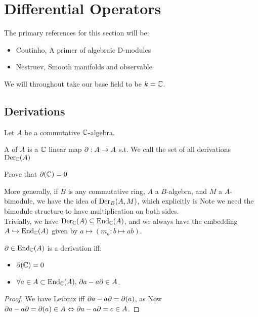\documentclass{article}
\begin{document}
\section{Differential Operators}

\begin{remark}
The primary references for this section will be:
\begin{itemize}
    \item Coutinho, A primer of algebraic D-modules
    \item Nestruev, Smooth manifolds and observable
\end{itemize}
We will throughout take our base field to be $k = \mathbb{C}$. 
\end{remark}

\subsection{Derivations}
Let $A$ be a commutative $\mathbb{C}$-algebra. 

\begin{definition}
A  of $A$ is a $\mathbb{C}$ linear map $\partial : A \to A$ s.t. 
We call the set of all derivations $\operatorname{Der}_{\mathbb{C}}(A)$
\end{definition}

\begin{ex}
Prove that $\partial(\mathbb{C}) = 0$
\end{ex}

More generally, if $B$ is any commutative ring, $A$ a $B$-algebra, and $M$ a $A$-bimodule, we have the idea of $\operatorname{Der}_B(A,M)$, which explicitly is 
Note we need the bimodule structure to have multiplication on both sides. \\
Trivially, we have $\operatorname{Der}_{\mathbb{C}}(A) \subseteq \operatorname{End}_{\mathbb{C}}(A)$, and we always have the embedding $ A \hookrightarrow \operatorname{End}_{\mathbb{C}}(A)$ given by $a \mapsto (m_a : b \mapsto ab)$. 

\begin{prop}
$\partial \in \operatorname{End}_{\mathbb{C}}(A)$ is a derivation iff:
\begin{itemize}
    \item $\partial(\mathbb{C}) = 0$
    \item $\forall a \in A\subset\operatorname{End}_{\mathbb{C}}(A), \, \partial a - a \partial \in A$. 
\end{itemize}
\end{prop}
\begin{proof}
We have Leibniz iff $\partial a - a\partial = \partial(a)$, as 
Now $\partial a - a \partial = \partial(a) \in A \Leftrightarrow \partial a - a \partial = c \in A$. 
\end{proof}
\end{document}
